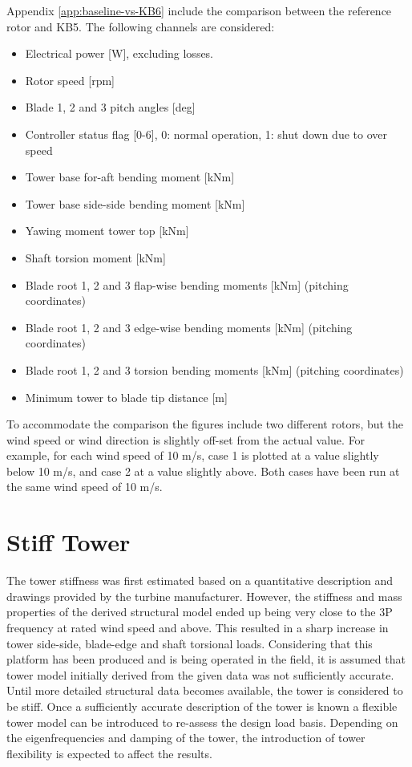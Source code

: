 Appendix \ref{app:baseline-vs-KB6} include the comparison between the reference rotor and KB5. The following channels are considered:
\begin{itemize}
	\item Electrical power [W], excluding losses.
    \item Rotor speed [rpm]
    \item Blade 1, 2 and 3 pitch angles [deg]
    \item Controller status flag [0-6], 0: normal operation, 1: shut down due to over speed
    \item Tower base for-aft bending moment [kNm]
    \item Tower base side-side bending moment [kNm]
    \item Yawing moment tower top [kNm]
    \item Shaft torsion moment [kNm]
    \item Blade root 1, 2 and 3 flap-wise bending moments [kNm] (pitching coordinates)
    \item Blade root 1, 2 and 3 edge-wise bending moments [kNm] (pitching coordinates)
    \item Blade root 1, 2 and 3 torsion bending moments [kNm] (pitching coordinates)
    \item Minimum tower to blade tip distance [m]
\end{itemize}

To accommodate the comparison the figures include two different rotors, but the wind speed or wind direction is slightly off-set from the actual value. For example, for each wind speed of 10 m/s, case 1 is plotted at a  value slightly below 10 m/s, and case 2 at a value slightly above. Both cases have been run at the same wind speed of 10 m/s.


\section{Stiff Tower}
\label{sec:dlb:Stiff Tower}

The tower stiffness was first estimated based on a quantitative description and drawings provided by the turbine manufacturer. However, the stiffness and mass properties of the derived structural model ended up being very close to the 3P frequency at rated wind speed and above. This resulted in a sharp increase in tower side-side, blade-edge and shaft torsional loads. Considering that this platform has been produced and is being operated in the field, it is assumed that tower model initially derived from the given data was not sufficiently accurate. Until more detailed structural data becomes available, the tower is considered to be stiff. Once a sufficiently accurate description of the tower is known a flexible tower model can be introduced to re-assess the design load basis. Depending on the eigenfrequencies and damping of the tower, the introduction of tower flexibility is expected to affect the results.


